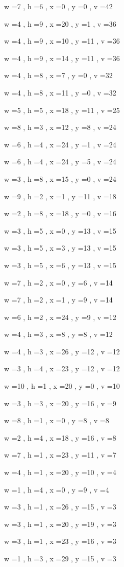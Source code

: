 \documentclass[11pt]{article}
\begin{document}
w =7 , h =6 , x =0 , y =0 , v =42
\par
w =4 , h =9 , x =20 , y =1 , v =36
\par
w =4 , h =9 , x =10 , y =11 , v =36
\par
w =4 , h =9 , x =14 , y =11 , v =36
\par
w =4 , h =8 , x =7 , y =0 , v =32
\par
w =4 , h =8 , x =11 , y =0 , v =32
\par
w =5 , h =5 , x =18 , y =11 , v =25
\par
w =8 , h =3 , x =12 , y =8 , v =24
\par
w =6 , h =4 , x =24 , y =1 , v =24
\par
w =6 , h =4 , x =24 , y =5 , v =24
\par
w =3 , h =8 , x =15 , y =0 , v =24
\par
w =9 , h =2 , x =1 , y =11 , v =18
\par
w =2 , h =8 , x =18 , y =0 , v =16
\par
w =3 , h =5 , x =0 , y =13 , v =15
\par
w =3 , h =5 , x =3 , y =13 , v =15
\par
w =3 , h =5 , x =6 , y =13 , v =15
\par
w =7 , h =2 , x =0 , y =6 , v =14
\par
w =7 , h =2 , x =1 , y =9 , v =14
\par
w =6 , h =2 , x =24 , y =9 , v =12
\par
w =4 , h =3 , x =8 , y =8 , v =12
\par
w =4 , h =3 , x =26 , y =12 , v =12
\par
w =3 , h =4 , x =23 , y =12 , v =12
\par
w =10 , h =1 , x =20 , y =0 , v =10
\par
w =3 , h =3 , x =20 , y =16 , v =9
\par
w =8 , h =1 , x =0 , y =8 , v =8
\par
w =2 , h =4 , x =18 , y =16 , v =8
\par
w =7 , h =1 , x =23 , y =11 , v =7
\par
w =4 , h =1 , x =20 , y =10 , v =4
\par
w =1 , h =4 , x =0 , y =9 , v =4
\par
w =3 , h =1 , x =26 , y =15 , v =3
\par
w =3 , h =1 , x =20 , y =19 , v =3
\par
w =3 , h =1 , x =23 , y =16 , v =3
\par
w =1 , h =3 , x =29 , y =15 , v =3
\par
\newpage
\end{document}
